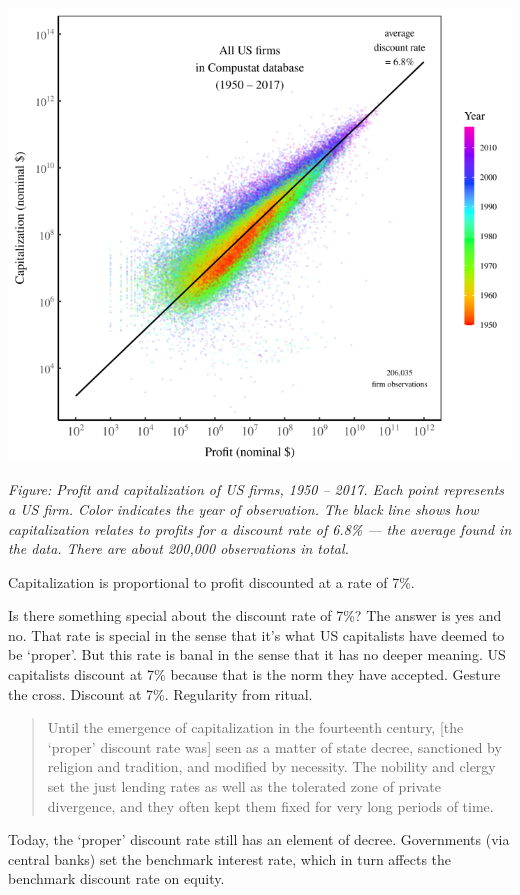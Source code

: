 \documentclass[
]{book}
\begin{document}
\includegraphics{fig/profit_cap.png}

\emph{Figure: Profit and capitalization of US firms, 1950 -- 2017. Each point represents a US firm. Color indicates the year of observation. The black line shows how capitalization relates to profits for a discount rate of 6.8\% --- the average found in the data. There are about 200,000 observations in total.}

Capitalization is proportional to profit discounted at a rate of 7\%.

Is there something special about the discount rate of 7\%? The answer is yes and no. That rate is special in the sense that it's what US capitalists have deemed to be `proper'. But this rate is banal in the sense that it has no deeper meaning. US capitalists discount at 7\% because that is the norm they have accepted. Gesture the cross. Discount at 7\%. Regularity from ritual.

\begin{quote}
Until the emergence of capitalization in the fourteenth century, {[}the `proper' discount rate was{]} seen as a matter of state decree, sanctioned by religion and tradition, and modified by necessity. The nobility and clergy set the just lending rates as well as the tolerated zone of private divergence, and they often kept them fixed for very long periods of time.
\end{quote}

Today, the `proper' discount rate still has an element of decree. Governments (via central banks) set the benchmark interest rate, which in turn affects the benchmark discount rate on equity.
\end{document}
